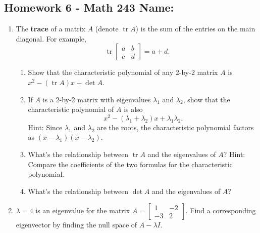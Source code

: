 \documentclass[10pt]{article}
\newcommand{\on}{\operatorname}
\newcommand{\tr}{\on{tr}}
\begin{document}
\pagestyle{empty}
\subsection*{Homework 6 - Math 243 \hfill Name: \underline{\hspace*{2in}}}


\noindent

\begin{enumerate}
\setcounter{enumi}{\theenumCount}
\item The \textbf{trace} of a matrix $A$ (denote $\tr A$) is the sum of the entries on the main diagonal.  For example, 
$$\tr \begin{bmatrix} a & b \\ c & d \end{bmatrix}= a + d.$$  
\begin{enumerate}
\item Show that the characteristic polynomial of any 2-by-2 matrix $A$ is $x^2 - (\tr A) x + \det A$.  
\vfill

\item If $A$ is a 2-by-2 matrix with eigenvalues $\lambda_1$ and $\lambda_2$, show that the characteristic polynomial of $A$ is also 
$$x^2 - (\lambda_1 + \lambda_2) x + \lambda_1 \lambda_2.$$  
Hint: Since $\lambda_1$ and $\lambda_2$ are the roots, the characteristic polynomial factors as 
$(x - \lambda_1) (x - \lambda_2).$
\vfill

\item What's the relationship between $\tr A$ and the eigenvalues of $A$? Hint: Compare the coefficients of the two formulas for the characteristic polynomial.  
\vfill


\item What's the relationship between $\det A$ and the eigenvalues of $A$?
\vfill
\end{enumerate}


\item $\lambda = 4$ is an eigenvalue for the matrix $A = \begin{bmatrix} 1 & -2\\-3 & 2\end{bmatrix}$. Find a corresponding eigenvector by finding the null space of $A - \lambda I$. 
\vfill
\setcounter{enumCount}{\theenumi}
\end{enumerate} 
\end{document}
